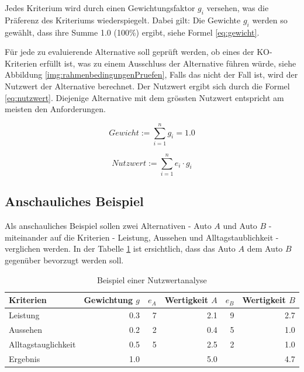   Jedes Kriterium wird durch einen Gewichtungsfaktor \(g_i\) versehen, was
  die Präferenz des Kriteriums wiederspiegelt. Dabei gilt: Die Gewichte \(g_i\)
  werden so gewählt, dass ihre Summe 1.0 (100\%) ergibt, siehe Formel
  \ref{eq:gewicht}.

  Für jede zu evaluierende Alternative soll geprüft werden, ob eines der
  KO-Kriterien erfüllt ist, was zu einem Ausschluss der Alternative führen
  würde, siehe Abbildung \ref{img:rahmenbedingungenPruefen}, Falls das nicht der
  Fall ist, wird der Nutzwert der Alternative berechnet. Der Nutzwert ergibt
  sich durch die Formel \ref{eq:nutzwert}. Diejenige Alternative mit dem
  grössten Nutzwert entspricht am meisten den Anforderungen.

  \begin{equation}
    \label{eq:gewicht}
    Gewicht := \sum \limits_{i=1}^n g_i = 1.0
  \end{equation}
  
  \begin{equation}
    \label{eq:nutzwert}
    Nutzwert := \sum \limits_{i=1}^n e_i \cdot g_i
  \end{equation}
  
  \subsection{Anschauliches Beispiel}
  
  Als anschauliches Beispiel sollen zwei Alternativen - Auto \(A\) und Auto
  \(B\) - miteinander auf die Kriterien - Leistung, Aussehen und
  Alltagstaublichkeit - verglichen werden. In der Tabelle \ref{tab:beispielNwa}
  ist ersichtlich, dass das Auto \(A\) dem Auto \(B\) gegenüber bevorzugt
  werden soll.
  \newline
  
  \begin{table}[h!]
    \sffamily 
    \begin{center}
      \begin{tabular}{lrrrrr}
        \toprule
        \textbf{Kriterien} & \textbf{Gewichtung \(g\)} & \textbf{\(e_A\)} &
        \textbf{Wertigkeit \(A\)} & \textbf{\(e_B\)} & \textbf{Wertigkeit
        \(B\)}\\
        \midrule
        Leistung            & 0.3 & 7 & 2.1 & 9 & 2.7 \\
        Aussehen            & 0.2 & 2 & 0.4 & 5 & 1.0 \\
        Alltagstauglichkeit & 0.5 & 5 & 2.5 & 2 & 1.0 \\
        \midrule
        \midrule
        Ergebnis            & 1.0 &   & 5.0 &   & 4.7 \\
        \bottomrule
      \end{tabular}
      \caption{Beispiel einer Nutzwertanalyse}
      \label{tab:beispielNwa}
    \end{center}
  \end{table}
  
